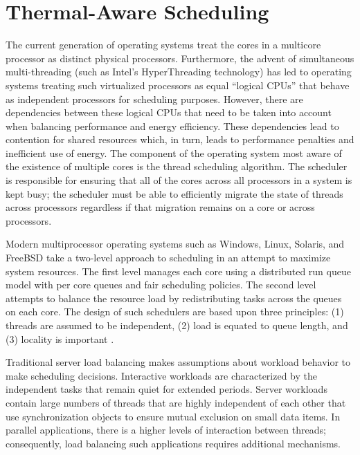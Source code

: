 %
%
\chapter{Thermal-Aware Scheduling}
\label{chp:schedule}
The current generation of operating systems treat the cores in a
multicore processor as distinct physical processors. Furthermore, the
advent of simultaneous multi-threading (such as Intel's HyperThreading
technology) has led to operating systems treating such virtualized
processors as equal ``logical CPUs'' that behave as independent
processors for scheduling purposes.  However, there are dependencies
between these logical CPUs that need to be taken into account when
balancing performance and energy efficiency.  These dependencies lead to
contention for shared resources which, in turn, leads to performance
penalties and inefficient use of energy.  The component of the operating
system most aware of the existence of multiple cores is the thread
scheduling algorithm.  The scheduler is responsible for ensuring that
all of the cores across all processors in a system is kept busy; the
scheduler must be able to efficiently migrate the state of threads
across processors regardless if that migration remains on a core or
across processors.

Modern multiprocessor operating systems such as Windows, Linux, Solaris,
and FreeBSD take a two-level approach to scheduling in an attempt to
maximize system resources.  The first level manages each core using a
distributed run queue model with per core queues and fair scheduling
policies. The second level attempts to balance the resource load by
redistributing tasks across the queues on each core.  The design of such
schedulers are based upon three principles: (1) threads are assumed to
be independent, (2) load is equated to queue length, and (3) locality is
important \cite{Hofmeyr2010}.

Traditional server load balancing makes assumptions about workload
behavior to make scheduling decisions.  Interactive workloads are
characterized by the independent tasks that remain quiet for extended
periods.  Server workloads contain large numbers of threads that are
highly independent of each other that use synchronization objects to
ensure mutual exclusion on small data items.  In parallel applications,
there is a higher levels of interaction between threads; consequently,
load balancing such applications requires additional mechanisms.  

